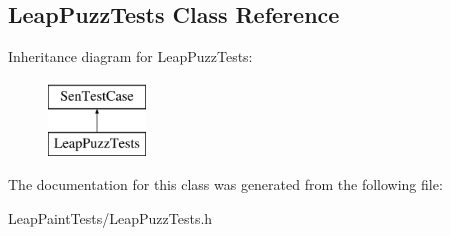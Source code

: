 \hypertarget{interface_leap_puzz_tests}{\subsection{Leap\-Puzz\-Tests Class Reference}
\label{da/da0/interface_leap_puzz_tests}
}
Inheritance diagram for Leap\-Puzz\-Tests\-:\begin{figure}[H]
\begin{center}
\leavevmode
\includegraphics[height=2.000000cm]{da/da0/interface_leap_puzz_tests}
\end{center}
\end{figure}


The documentation for this class was generated from the following file\-:\begin{DoxyCompactItemize}
\item 
Leap\-Paint\-Tests/Leap\-Puzz\-Tests.\-h\end{DoxyCompactItemize}

